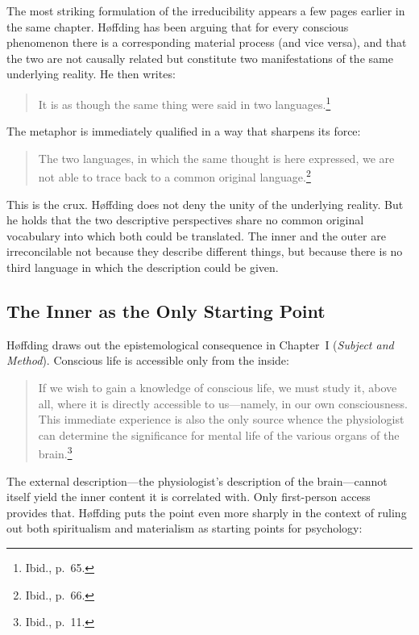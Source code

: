 \documentclass[12pt, a4paper]{article}
\begin{document}
The most striking formulation of the irreducibility appears a few
pages earlier in the same chapter. H{\o}ffding has been arguing that
for every conscious phenomenon there is a corresponding material
process (and vice versa), and that the two are not causally related
but constitute two manifestations of the same underlying reality.
He then writes:

\begin{quote}
It is as though the same thing were said in two
languages.\footnote{Ibid., p.~65.}
\end{quote}

\noindent
The metaphor is immediately qualified in a way that sharpens its
force:

\begin{quote}
The two languages, in which the same thought is here expressed, we
are not able to trace back to a common original
language.\footnote{Ibid., p.~66.}
\end{quote}

\noindent
This is the crux. H{\o}ffding does not deny the unity of the
underlying reality. But he holds that the two descriptive perspectives
share no common original vocabulary into which both could be
translated. The inner and the outer are irreconcilable not because
they describe different things, but because there is no third language
in which the description could be given.

\subsection*{The Inner as the Only Starting Point}

H{\o}ffding draws out the epistemological consequence in Chapter~I
(\emph{Subject and Method}). Conscious life is accessible only from
the inside:

\begin{quote}
If we wish to gain a knowledge of conscious life, we must study it,
above all, where it is directly accessible to us---namely, in our own
consciousness. This immediate experience is also the only source
whence the physiologist can determine the significance for mental
life of the various organs of the brain.\footnote{Ibid., p.~11.}
\end{quote}

\noindent
The external description---the physiologist's description of the
brain---cannot itself yield the inner content it is correlated with.
Only first-person access provides that. H{\o}ffding puts the
point even more sharply in the context of ruling out both spiritualism
and materialism as starting points for psychology:
\end{document}
